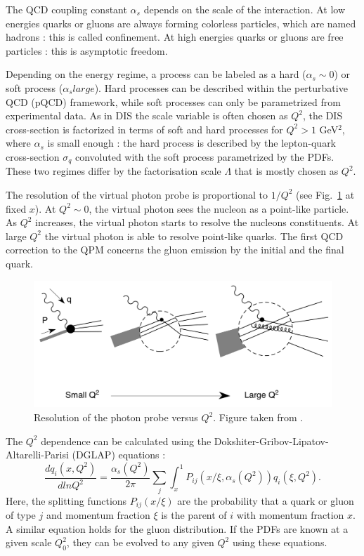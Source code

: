 The QCD coupling constant $\alpha_s$ depends on the scale of the interaction. At low energies quarks or gluons are always forming colorless particles, which are named hadrons : this is called confinement. At high energies quarks or gluons are free particles : this is asymptotic freedom.

Depending on the energy regime, a process can be labeled as a hard ($\alpha_s \sim 0$) or soft process ($\alpha_s large$). Hard processes can be described within the perturbative QCD (pQCD) framework, while soft processes can only be parametrized from experimental data. As in DIS the scale variable is often chosen as $Q^2$, the DIS cross-section is factorized \cite{CollinsSoper} in terms of soft and hard processes for $Q^2 > 1$ GeV$^2$, where $\alpha_s$ is small enough : the hard process is described by the lepton-quark cross-section $\sigma_q$ convoluted with the soft process parametrized by the PDFs. These two regimes differ by the factorisation scale $\Lambda$ that is mostly chosen as $Q^2$.

The resolution of the virtual photon probe is proportional to $1/Q^2$ (see Fig.~\ref{pic:Q2res} at fixed $x$). At $Q^2 \sim 0$, the virtual photon sees the nucleon as a point-like particle. As $Q^2$ increases, the virtual photon starts to resolve the nucleons constituents. At large $Q^2$ the virtual photon is able to resolve point-like quarks. The first QCD correction to the QPM concerns the gluon emission by the initial and the final quark.

\begin{figure}[!h]
  \centering
	\includegraphics[scale=0.6]{./gfx/Q2res.png}
	\caption{Resolution of the photon probe versus $Q^2$. Figure taken from \cite{PICH}.}
	\label{pic:Q2res}
\end{figure}

The $Q^2$ dependence can be calculated using the Dokshiter-Gribov-Lipatov-Altarelli-Parisi (DGLAP) equations \cite{Dokshitser, GL1, GL2, AP} :
%
\begin{equation}
  \frac{dq_i(x,Q^2)}{dlnQ^2} = \frac{\alpha_s(Q^2)}{2\pi}\sum\limits_{j}\int_{x}^{1}P_{ij}(x/\xi,\alpha_s(Q^2))q_i(\xi,Q^2).
\end{equation}
%
Here, the splitting functions $P_{ij}(x/\xi)$ \cite{Joosten} are the probability that a quark or gluon of type $j$ and momentum fraction $\xi$ is the parent of $i$ with momentum fraction $x$. A similar equation holds for the gluon distribution. If the PDFs are known at a given scale $Q_0^2$, they can be evolved to any given $Q^2$ using these equations.

